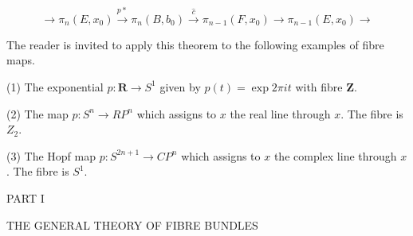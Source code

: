 $$\rightarrow \pi_n(E, x_0) \xrightarrow{p*} \pi_n(B, b_0) \xrightarrow{\hat{c}} \pi_{n-1}(F, x_0) \rightarrow \pi_{n-1}(E, x_0) \rightarrow$$

The reader is invited to apply this theorem to the following examples of fibre maps.

(1) The exponential $p: \mathbf{R} \rightarrow S^1$ given by $p(t) = \exp 2\pi it$ with fibre $\mathbf{Z}$.

(2) The map $p: S^n \rightarrow RP^n$ which assigns to $x$ the real line through $x$. The fibre is $Z_2$.

(3) The Hopf map $p: S^{2n+1} \rightarrow CP^n$ which assigns to $x$ the complex line through $x$. The fibre is $S^1$.

PART I

THE GENERAL THEORY OF FIBRE BUNDLES
